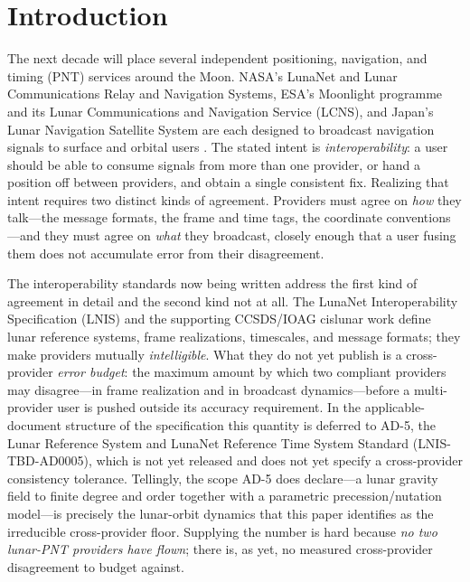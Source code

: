 \section{Introduction}
\label{sec:intro}

The next decade will place several independent positioning, navigation, and timing
(PNT) services around the Moon. NASA's LunaNet and Lunar Communications Relay and
Navigation Systems, ESA's Moonlight programme and its Lunar Communications and
Navigation Service (LCNS), and Japan's Lunar Navigation Satellite System are each
designed to broadcast navigation signals to surface and orbital users
\citep{israel2020lunanet,fienga2024moonlight}. The stated intent is
\emph{interoperability}: a user should be able to consume signals from more than one
provider, or hand a position off between providers, and obtain a single consistent
fix. Realizing that intent requires two distinct kinds of agreement. Providers must
agree on \emph{how} they talk---the message formats, the frame and time tags, the
coordinate conventions---and they must agree on \emph{what} they broadcast, closely
enough that a user fusing them does not accumulate error from their disagreement.

The interoperability standards now being written address the first kind of agreement
in detail and the second kind not at all. The LunaNet Interoperability
Specification (LNIS) and the supporting CCSDS/IOAG cislunar work
\citep{lnis2023,ioag2022lunar} define lunar reference systems, frame realizations,
timescales, and message formats; they make providers mutually \emph{intelligible}.
What they do not yet publish is a cross-provider \emph{error budget}: the maximum
amount by which two compliant providers may disagree---in frame realization and in
broadcast dynamics---before a multi-provider user is pushed outside its accuracy
requirement. In the applicable-document structure of the specification this quantity
is deferred to AD-5, the Lunar Reference System and LunaNet Reference Time System
Standard ({LNIS-TBD-AD0005}), which is not yet released and does not yet specify a
cross-provider consistency tolerance. Tellingly, the scope AD-5 does declare---a
lunar gravity field to finite degree and order together with a parametric
precession/nutation model---is precisely the lunar-orbit dynamics that this paper
identifies as the irreducible cross-provider floor. Supplying the number is hard
because \emph{no two lunar-PNT providers have flown}; there is, as yet, no measured
cross-provider disagreement to budget against.

